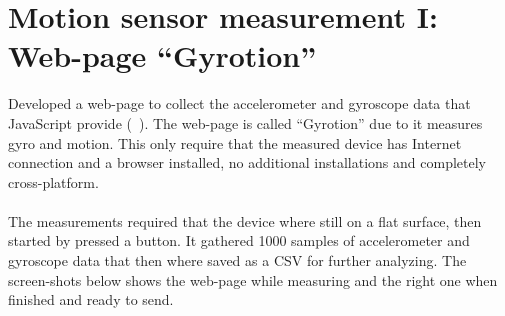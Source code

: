 \section{Motion sensor measurement I: Web-page ``Gyrotion''}\label{sec:measurement:gyrotion}
Developed a web-page to collect the accelerometer and gyroscope data that JavaScript provide (~).  The web-page is called ``Gyrotion'' due to it measures gyro and motion.
This only require that the measured device has Internet connection and a browser installed, no additional installations and completely cross-platform.\\
\\
The measurements required that the device where still on a flat surface, then started by pressed a button. It gathered 1000 samples of accelerometer and gyroscope data that then where saved as a CSV for further analyzing. The screen-shots below shows the web-page while measuring and the right one when finished and ready to send. 
